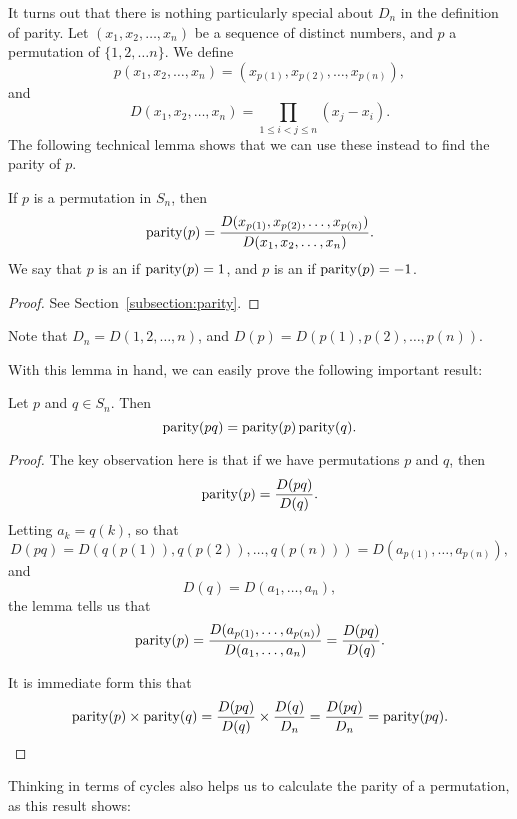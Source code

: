It turns out that there is nothing particularly special about $D_{n}$ in
the definition of parity.  Let $(x_{1}, x_{2}, \ldots, x_{n})$ be a sequence of distinct numbers, and $p$
a permutation of $\{1, 2, \ldots n\}$.  We define
\begin{equation}\label{eqn:permutationaction}
  p(x_{1}, x_{2}, \ldots, x_{n}) = (x_{p(1)}, x_{p(2)}, \ldots, x_{p(n)}),
\end{equation}
and
\[
  D(x_{1}, x_{2}, \ldots, x_{n}) = \prod_{1 \le i < j \le n} (x_{j} - x_{i}).
\]
The following technical lemma shows that we can use these instead to find the
parity of $p$.

\begin{lemma}\label{lemma:paritytechnical}
  If $p$ is a permutation in $S_{n}$, then
  \[
    \operatorname{parity}(p) = \frac{D(x_{p(1)}, x_{p(2)}, \ldots, x_{p(n)})}{D(x_{1}, x_{2},
    \ldots, x_{n})}.
  \]
  We say that $p$ is an  if
  $\operatorname{parity}(p) = 1$, and $p$ is an  if
  $\operatorname{parity}(p) = -1$.
\end{lemma}
\begin{proof}
  See Section~\ref{subsection:parity}.
\end{proof}

Note that $D_{n} = D(1, 2, \ldots, n)$, and $D(p) = D(p(1), p(2), \ldots, p(n))$.

With this lemma in hand, we can easily prove the following important result:

\begin{theorem}\label{thm:parityproduct}
  Let $p$ and $q \in S_{n}$.  Then
  \[
    \operatorname{parity}(pq) = \operatorname{parity}(p)\operatorname{parity}(q).
  \]
\end{theorem}
\begin{proof}
  The key observation here is that if we have permutations $p$ and $q$,
  then
  \[
    \operatorname{parity}(p) = \frac{D(pq)}{D(q)}.
  \]
  Letting $a_{k} = q(k)$, so that
  \[
    D(pq) = D(q(p(1)), q(p(2)), \ldots, q(p(n))) = D(a_{p(1)}, \ldots, a_{p(n)}),
  \]
  and
  \[
    D(q) = D(a_{1}, \ldots, a_{n}),
  \]
  the lemma tells us that
  \[
    \operatorname{parity}(p) = \frac{D(a_{p(1)}, \ldots, a_{p(n)})}{D(a_{1}, \ldots, a_{n})}
     = \frac{D(pq)}{D(q)}.
  \]
  
  It is immediate form this that
  \[
    \operatorname{parity}(p) \times \operatorname{parity}(q) = \frac{D(pq)}{D(q)} \times \frac{D(q)}{D_{n}}
    = \frac{D(pq)}{D_{n}} = \operatorname{parity}(pq).
  \]
\end{proof}

Thinking in terms of cycles also helps us to calculate the parity of a
permutation, as this result shows:

